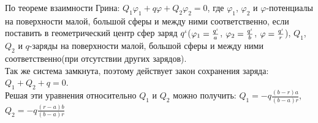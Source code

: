 \begin{sol}
По теореме взаимности Грина: $Q_1\varphi_1+q\varphi+Q_2\varphi_2=0$, где $\varphi_1$, $\varphi_2$ и $\varphi$-потенциалы на поверхности малой, большой сферы и между ними соответственно, если поставить в геометрический центр сфер заряд $q`$($\varphi_1=\frac{q`}{a}$, $\varphi_2=\frac{q`}{b}$, $\varphi=\frac{q`}{r}$), $Q_1$, $Q_2$ и $q$-заряды на поверхности малой, большой сферы и между ними соответственно(при отсутствии других зарядов).\\ Так же система замкнута, поэтому действует закон сохранения заряда: $Q_1+Q_2+q=0$.\\
Решая эти уравнения относительно $Q_1$ и $Q_2$ можно получить: $Q_1=-q\frac{(b-r)a}{(b-a)r}$, $Q_2=-q\frac{(r-a)b}{(b-a)r}$
\end{sol}